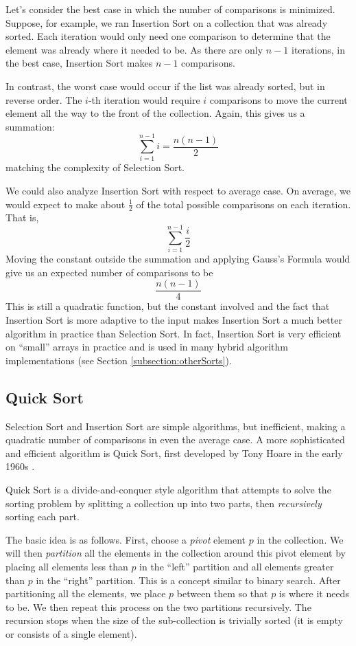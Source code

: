 Let's consider the best case in which the number of comparisons is minimized.
Suppose, for example, we ran Insertion Sort on a collection that was already
sorted.  Each iteration would only need one comparison to determine that the
element was already where it needed to be.  As there are only $n-1$ iterations,
in the best case, Insertion Sort makes $n-1$ comparisons.  

In contrast, the worst case would occur if the list was already sorted, but
in reverse order.  The $i$-th iteration would require $i$ comparisons to
move the current element all the way to the front of the collection.  Again, 
this gives us a summation:
$$\sum_{i=1}^{n-1} i = \frac{n(n-1)}{2}$$
matching the complexity of Selection Sort.

We could also analyze Insertion Sort with respect to average case.  On 
average, we would expect to make about $\frac{1}{2}$ of the total 
possible comparisons on each iteration.  That is, 
$$\sum_{i=1}^{n-1} \frac{i}{2}$$
Moving the constant outside the summation and applying Gauss's Formula
would give us an expected number of comparisons to be
$$\frac{n(n-1)}{4}$$
This is still a quadratic function, but the constant involved and the
fact that Insertion Sort is more adaptive to the input makes Insertion
Sort a much better algorithm in practice than Selection Sort.  In
fact, Insertion Sort is very efficient on ``small'' arrays in practice
and is used in many hybrid algorithm implementations (see Section
\ref{subsection:otherSorts}).


\subsection{Quick Sort}

Selection Sort and Insertion Sort are simple algorithms, but inefficient, 
making a quadratic number of comparisons in even the average case.  A
more sophisticated and efficient algorithm is Quick Sort, first developed
by Tony Hoare in the early 1960s \cite{Hoare:1961:AQ:366622.366644,Quicksort}.

Quick Sort is a divide-and-conquer style algorithm that attempts to solve
the sorting problem by splitting a collection up into two parts, then
\emph{recursively} sorting each part.  

The basic idea is as follows.  First, choose a \emph{pivot} element $p$
in the collection.  We will then \emph{partition} all the elements in the
collection around this pivot element by placing all elements less than
$p$ in the ``left'' partition and all elements greater than $p$ in the
``right'' partition.  This is a concept similar to binary search.  After
partitioning all the elements, we place $p$ between them so that $p$ is
where it needs to be.  We then repeat this process on the two partitions
recursively.  The recursion stops when the size of the sub-collection is
trivially sorted (it is empty or consists of a single element).

